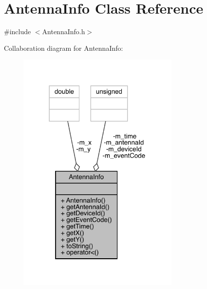 \hypertarget{class_antenna_info}{}\section{Antenna\+Info Class Reference}
\label{class_antenna_info}


{\ttfamily \#include $<$Antenna\+Info.\+h$>$}



Collaboration diagram for Antenna\+Info\+:\nopagebreak
\begin{figure}[H]
\begin{center}
\leavevmode
\includegraphics[width=228pt]{class_antenna_info__coll__graph}
\end{center}
\end{figure}
